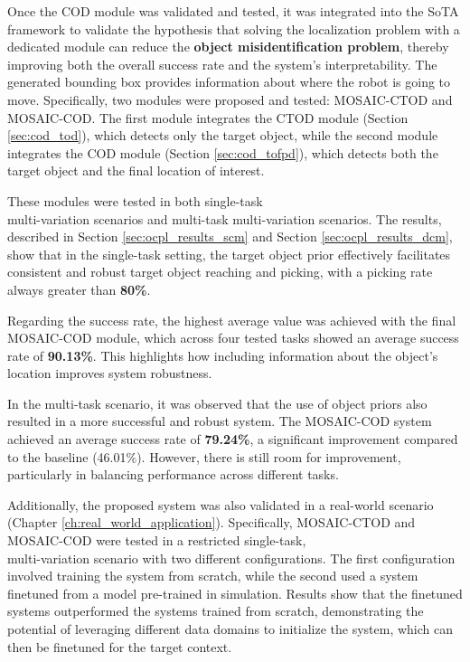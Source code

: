 Once the COD module was validated and tested, it was integrated into the SoTA framework to validate the hypothesis that solving the localization problem with a dedicated module can reduce the \textbf{object misidentification problem}, thereby improving both the overall success rate and the system's interpretability. The generated bounding box provides information about where the robot is going to move. Specifically, two modules were proposed and tested: MOSAIC-CTOD and MOSAIC-COD. The first module integrates the CTOD module (Section \ref{sec:cod_tod}), which detects only the target object, while the second module integrates the COD module (Section \ref{sec:cod_tofpd}), which detects both the target object and the final location of interest.

These modules were tested in both single-task \\ multi-variation scenarios and multi-task multi-variation scenarios. The results, described in Section \ref{sec:ocpl_results_scm} and Section \ref{sec:ocpl_results_dcm}, show that in the single-task setting, the target object prior effectively facilitates consistent and robust target object reaching and picking, with a picking rate always greater than \textbf{80\%}. 

Regarding the success rate, the highest average value was achieved with the final MOSAIC-COD module, which across four tested tasks showed an average success rate of \textbf{90.13\%}. This highlights how including information about the object's location improves system robustness. 

In the multi-task scenario, it was observed that the use of object priors also resulted in a more successful and robust system. The MOSAIC-COD system achieved an average success rate of \textbf{79.24\%}, a significant improvement compared to the baseline (46.01\%). However, there is still room for improvement, particularly in balancing performance across different tasks.

Additionally, the proposed system was also validated in a real-world scenario (Chapter \ref{ch:real_world_application}). Specifically, MOSAIC-CTOD and MOSAIC-COD were tested in a restricted single-task, \\ multi-variation scenario with two different configurations. The first configuration involved training the system from scratch, while the second used a system finetuned from a model pre-trained in simulation. Results show that the finetuned systems outperformed the systems trained from scratch, demonstrating the potential of leveraging different data domains to initialize the system, which can then be finetuned for the target context.

